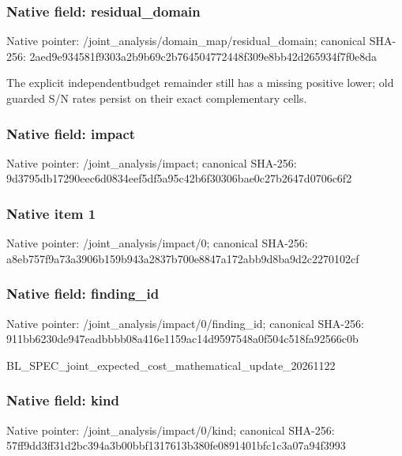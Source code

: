 \documentclass[10pt,a4paper]{article}
\begin{document}
\subsubsection{Native field: residual\_domain}


Native pointer: /joint\_analysis/domain\_m\allowbreak{}ap/residual\_domain; canonical SHA-256: 2aed9e934581f9303a2b9b69\allowbreak{}c2b764504772448f309e8bb4\allowbreak{}2d265934f7f0e8da


The explicit independentbudget remainder still has a missing positive lower; old guarded S/N rates persist on their exact complementary cells.


\subsubsection{Native field: impact}


Native pointer: /joint\_analysis/impact; canonical SHA-256: 9d3795db17290eec6d0834ee\allowbreak{}f5df5a95c42b6f30306bae0c\allowbreak{}27b2647d0706c6f2



\subsubsection{Native item 1}


Native pointer: /joint\_analysis/impact/0; canonical SHA-256: a8eb757f9a73a3906b159b94\allowbreak{}3a2837b700e8847a172abb9d\allowbreak{}8ba9d2c2270102cf



\subsubsection{Native field: finding\_id}


Native pointer: /joint\_analysis/impact/0/finding\_id; canonical SHA-256: 911bb6230de947eadbbbb08a\allowbreak{}416e1159ac14d9597548a0f5\allowbreak{}04c518fa92566c0b


BL\_SPEC\_joint\_expected\_c\allowbreak{}ost\_mathematical\_update\_\allowbreak{}20261122


\subsubsection{Native field: kind}


Native pointer: /joint\_analysis/impact/0/kind; canonical SHA-256: 57ff9dd3ff31d2bc394a3b00\allowbreak{}bbf1317613b380fe0891401b\allowbreak{}fc1c3a07a94f3993
\end{document}
